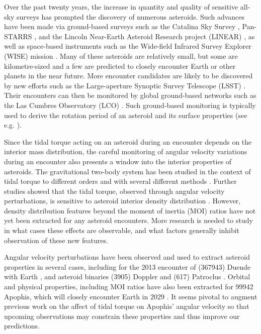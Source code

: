 \documentclass[fleqn,usenatbib]{mnras}
\begin{document}
Over the past twenty years, the increase in quantity and quality of sensitive all-sky surveys has prompted the discovery of numerous asteroids. Such advances have been made via ground-based surveys such as the Catalina Sky Survey \cite{larson1998catalina}, Pan-STARRS \cite{kaiser2002pan}, and the Lincoln Near-Earth Asteroid Research project (LINEAR) \cite{stokes2000lincoln}, as well as space-based instruments such as the Wide-field Infrared Survey Explorer (WISE) mission \cite{wright2010wide}. Many of these asteroids are relatively small, but some are kilometre-sized and a few are predicted to closely encounter Earth or other planets in the near future. More encounter candidates are likely to be discovered by new efforts such as the Large-aperture Synoptic Survey Telescope (LSST) \cite{tyson2002large}. Their encounters can then be monitored by global ground-based networks such as the Las Cumbres Observatory (LCO) \cite{brown2013cumbres}. Such ground-based monitoring is typically used to derive the rotation period of an asteroid and its surface properties (see e.g. \cite{10.1093/mnras/stab1252}).

Since the tidal torque acting on an asteroid during an encounter depends on the interior mass distribution, the careful monitoring of angular velocity variations during an encounter also presents a window into the interior properties of asteroids. The gravitational two-body system has
been studied in the context of tidal torque to different orders
and with several different methods \cite{paul88, SCHEERES2000106, ashenberg07, BOUE2009750, HouMar2017}. Further studies showed that the tidal torque, observed through angular velocity perturbations, is sensitive to asteroid interior density distribution \cite{Naidu_2015, Makarov2022ChaosOO, scheeres2004evolution}. However, density distribution features beyond the moment of inertia (MOI) ratios have not yet been extracted for any asteroid encounters. More research is needed to study in what cases these effects are observable, and what
factors generally inhibit observation of these new features. 

Angular velocity perturbations have been observed and
used to extract asteroid properties in several cases, including
for the 2013 encounter of (367943) Duende with Earth \cite{MOSKOVITZ2020113519, benson2020spin}, and asteroid
binaries (3905) Doppler and (617) Patroclus \cite{DESCAMPS2020113726, BERTHIER2020113990}. Orbital and physical properties, including MOI ratios have also been extracted for 99942 Apophis, which will closely encounter Earth in 2029 \cite{yu2014numerical, hirabayashi2021finite, valvano2022apophis, Lee2022Apophis}. It seems pivotal to augment previous work on the affect of tidal torque on Apophis' angular velocity \cite{souchay2014rotational, souchay2018changes} so that upcoming observations may constrain these properties and thus improve our predictions.
\end{document}
